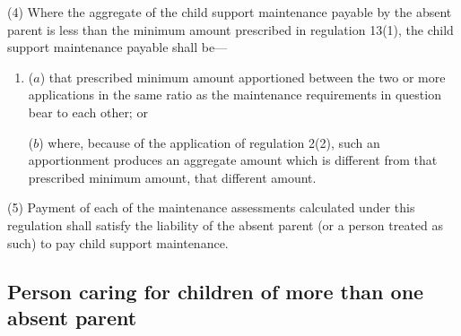 \documentclass[12pt,a4paper]{article}
\begin{document}
(4) Where the aggregate of the child support maintenance payable by the absent parent is less than the minimum amount prescribed in regulation 13(1), the child support maintenance payable shall be---
\begin{enumerate}\item[]
($a$) that prescribed minimum amount apportioned between the two or more applications in the same ratio as the maintenance requirements in question bear to each other; or

($b$) where, because of the application of regulation 2(2), such an apportionment produces an aggregate amount which is different from that prescribed minimum amount, that different amount.
\end{enumerate}

(5) Payment of each of the maintenance assessments calculated under this regulation shall satisfy the liability of the absent parent (or a person treated as such) to pay child support maintenance.


\subsection[23. Person caring for children of more than one absent parent]{Person caring for children of more than one absent parent}
\end{document}
